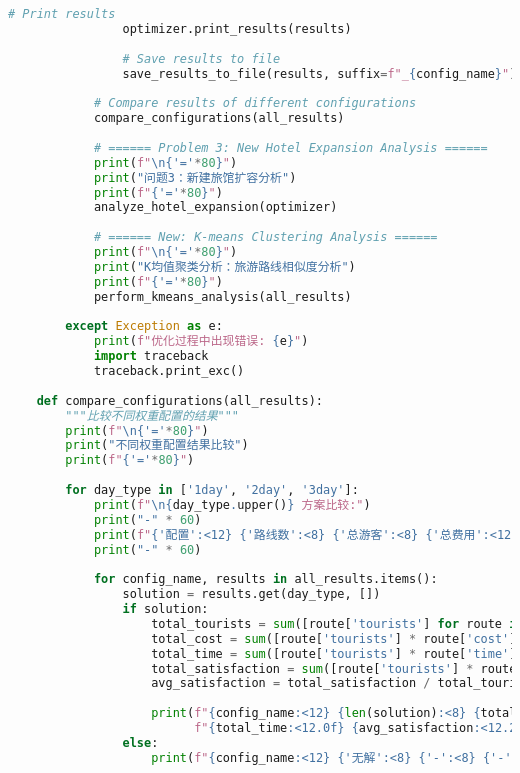 \begin{lstlisting}[language=Python]
                # Print results
                optimizer.print_results(results)
                
                # Save results to file
                save_results_to_file(results, suffix=f"_{config_name}")
            
            # Compare results of different configurations
            compare_configurations(all_results)
    
            # ====== Problem 3: New Hotel Expansion Analysis ======
            print(f"\n{'='*80}")
            print("问题3：新建旅馆扩容分析")
            print(f"{'='*80}")
            analyze_hotel_expansion(optimizer)
            
            # ====== New: K-means Clustering Analysis ======
            print(f"\n{'='*80}")
            print("K均值聚类分析：旅游路线相似度分析")
            print(f"{'='*80}")
            perform_kmeans_analysis(all_results)
            
        except Exception as e:
            print(f"优化过程中出现错误: {e}")
            import traceback
            traceback.print_exc()
    
    def compare_configurations(all_results):
        """比较不同权重配置的结果"""
        print(f"\n{'='*80}")
        print("不同权重配置结果比较")
        print(f"{'='*80}")
        
        for day_type in ['1day', '2day', '3day']:
            print(f"\n{day_type.upper()} 方案比较:")
            print("-" * 60)
            print(f"{'配置':<12} {'路线数':<8} {'总游客':<8} {'总费用':<12} {'总时间':<12} {'平均满意度':<12}")
            print("-" * 60)
            
            for config_name, results in all_results.items():
                solution = results.get(day_type, [])
                if solution:
                    total_tourists = sum([route['tourists'] for route in solution])
                    total_cost = sum([route['tourists'] * route['cost'] for route in solution])
                    total_time = sum([route['tourists'] * route['time'] for route in solution])
                    total_satisfaction = sum([route['tourists'] * route['satisfaction'] for route in solution])
                    avg_satisfaction = total_satisfaction / total_tourists if total_tourists > 0 else 0
                    
                    print(f"{config_name:<12} {len(solution):<8} {total_tourists:<8} {total_cost:<12.0f} "
                          f"{total_time:<12.0f} {avg_satisfaction:<12.2f}")
                else:
                    print(f"{config_name:<12} {'无解':<8} {'-':<8} {'-':<12} {'-':<12} {'-':<12}")
    

\end{lstlisting}
